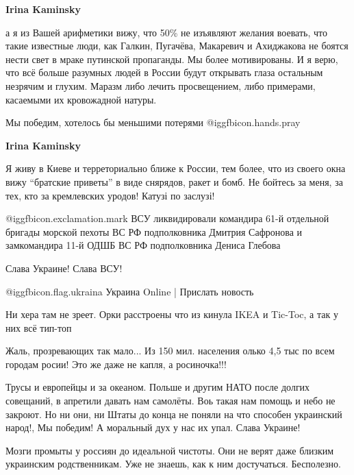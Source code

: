 \begin{itemize}
\begin{itemize} %
\textbf{Irina Kaminsky} 

а я из Вашей арифметики вижу, что 50\% не изъявляют желания воевать, что такие
известные люди, как Галкин, Пугачёва, Макаревич и Ахиджакова не боятся нести
свет в мраке путинской пропаганды. Мы более мотивированы. И я верю, что всё
больше разумных людей в России будут открывать глаза остальным незрячим и
глухим. Маразм либо лечить просвещением, либо примерами, касаемыми их
кровожадной натуры.

Мы победим, хотелось бы меньшими потерями @igg{fbicon.hands.pray} 

\textbf{Irina Kaminsky} 

Я живу в Киеве и терреториально ближе к России, тем более, что из своего окна
вижу \enquote{братские приветы} в виде снярядов, ракет и бомб. Не бойтесь за меня, за
тех, кто за кремлевских уродов! Катузі по заслузі!

\end{itemize} %


@igg{fbicon.exclamation.mark} ВСУ ликвидировали командира 61-й отдельной бригады морской пехоты ВС РФ
подполковника Дмитрия Сафронова и замкомандира 11-й ОДШБ ВС РФ подполковника
Дениса Глебова

Слава Украине! Слава ВСУ!

@igg{fbicon.flag.ukraina} Украина Online | Прислать новость

Ни хера там не зреет. Орки расстроены что из кинула IKEA и Tic-Toc, а так у них всё тип-топ

Жаль, прозревающих так мало... Из 150 мил. населения олько 4,5 тыс по всем
городам росии! Это же даже не капля, а росиночка!!!


Трусы и европейцы и за океаном. Польше и другим НАТО после долгих совещаний, в
апретили давать нам самолёты. Воь такая нам помощь и небо не закроют. Но ни
они, ни Штаты до конца не поняли на что способен украинский народ!, Мы победим! А
моральный дух у нас их упал. Слава Украине!



Мозги промыты у россиян до идеальной чистоты. Они не верят даже близким
украинским родственникам. Уже не знаешь, как к ним достучаться. Бесполезно.



\end{itemize}
